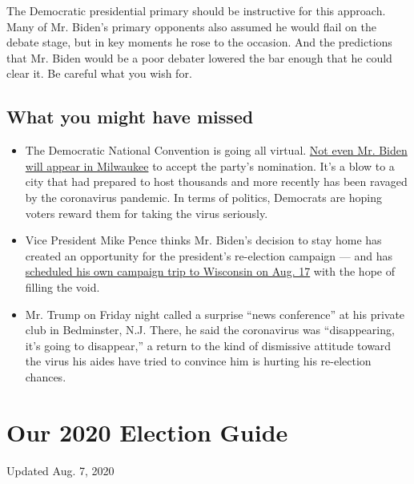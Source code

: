 The Democratic presidential primary should be instructive for this
approach. Many of Mr. Biden's primary opponents also assumed he would
flail on the debate stage, but in key moments he rose to the occasion.
And the predictions that Mr. Biden would be a poor debater lowered the
bar enough that he could clear it. Be careful what you wish for.

\hypertarget{what-you-might-have-missed}{%
\subsection{What you might have
missed}\label{what-you-might-have-missed}}

\begin{itemize}
\item
  The Democratic National Convention is going all virtual.
  \href{https://www.nytimes.com/2020/08/05/us/politics/joe-biden-milwaukee.html}{Not
  even Mr. Biden will appear in Milwaukee} to accept the party's
  nomination. It's a blow to a city that had prepared to host thousands
  and more recently has been ravaged by the coronavirus pandemic. In
  terms of politics, Democrats are hoping voters reward them for taking
  the virus seriously.
\item
  Vice President Mike Pence thinks Mr. Biden's decision to stay home has
  created an opportunity for the president's re-election campaign ---
  and has
  \href{https://www.nytimes.com/2020/08/07/us/politics/pence-wisconsin-biden-convention.html?smid=tw-share}{scheduled
  his own campaign trip to Wisconsin on Aug. 17} with the hope of
  filling the void.
\item
  Mr. Trump on Friday night called a surprise ``news conference'' at his
  private club in Bedminster, N.J. There, he said the coronavirus was
  ``disappearing, it's going to disappear,'' a return to the kind of
  dismissive attitude toward the virus his aides have tried to convince
  him is hurting his re-election chances.
\end{itemize}

\hypertarget{our-2020-election-guide}{%
\section{Our 2020 Election Guide}\label{our-2020-election-guide}}

Updated Aug. 7, 2020

